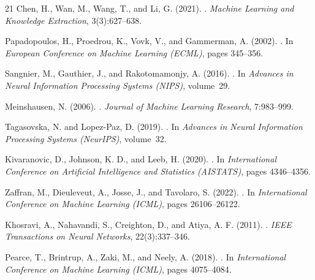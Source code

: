 \documentclass{article}
\begin{document}
\begin{thebibliography}{21}
Chen, H., Wan, M., Wang, T., and Li, G. (2021).
.
\newblock \emph{Machine Learning and Knowledge Extraction}, 3(3):627--638.

Papadopoulos, H., Proedrou, K., Vovk, V., and Gammerman, A. (2002).
.
\newblock In \emph{European Conference on Machine Learning (ECML)}, pages 345--356.

Sangnier, M., Gauthier, J., and Rakotomamonjy, A. (2016).
.
\newblock In \emph{Advances in Neural Information Processing Systems (NIPS)}, volume~29.

Meinshausen, N. (2006).
.
\newblock \emph{Journal of Machine Learning Research}, 7:983--999.

Tagasovska, N. and Lopez-Paz, D. (2019).
.
\newblock In \emph{Advances in Neural Information Processing Systems (NeurIPS)}, volume~32.

Kivaranovic, D., Johnson, K. D., and Leeb, H. (2020).
.
\newblock In \emph{International Conference on Artificial Intelligence and Statistics (AISTATS)}, pages 4346--4356.

Zaffran, M., Dieuleveut, A., Josse, J., and Tavolaro, S. (2022).
.
\newblock In \emph{International Conference on Machine Learning (ICML)}, pages 26106--26122.

Khosravi, A., Nahavandi, S., Creighton, D., and Atiya, A. F. (2011).
.
\newblock \emph{IEEE Transactions on Neural Networks}, 22(3):337--346.

Pearce, T., Brintrup, A., Zaki, M., and Neely, A. (2018).
.
\newblock In \emph{International Conference on Machine Learning (ICML)}, pages 4075--4084.


\end{thebibliography}
\end{document}
